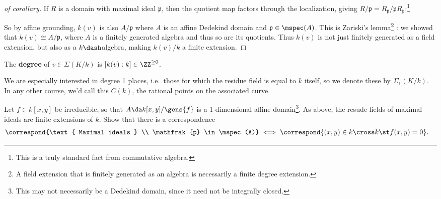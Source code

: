 \begin{proof}[of corollary]

If \(R\) is a domain with maximal ideal \(\mathfrak{p}\), then the
quotient map factors through the localization, giving
\(R/\mathfrak{p} = R_{\mathfrak{p}} / \mathfrak{p} R_{\mathfrak{p}}\):\footnote{This
  is a truly standard fact from commutative algebra.}

\begin{center}\end{center}

So by affine grounding, \(k(v)\) is also \(A/\mathfrak{p}\) where \(A\)
is an affine Dedekind domain and \(\mathfrak{p}\in \mspec(A)\). This is
Zariski's lemma\footnote{A field extension that is finitely generated as
  an algebra is necessarily a finite degree extension.} : we showed that
\(k(v) \cong A/\mathfrak{p}\), where \(A\) is a finitely generated
algebra and thus so are its quotients. Thus \(k(v)\) is not just
finitely generated as a field extension, but also as a
\(k\dash\)algebra, making \(k(v)/k\) a finite extension.

\end{proof}

\begin{definition}

The \textbf{degree} of \(v\in \Sigma(K/k)\) is
\([k(v) : k] \in \ZZ^{\geq 0}\).

\end{definition}

We are especially interested in degree 1 places, i.e.~those for which
the residue field is equal to \(k\) itself, so we denote these by
\(\Sigma_1(K/k)\). In any other course, we'd call this \(C(k)\), the
rational points on the associated curve.

\begin{exercise}

Let \(f\in k[x, y]\) be irreducible, so that
\(A \da k[x, y] / \gens{f}\) is a 1-dimensional affine
domain\footnote{This may not necessarily be a Dedekind domain, since it
  need not be integrally closed.}. As above, the resude fields of
maximal ideals are finite extensions of \(k\). Show that there is a
correspondence
\begin{align*}  
\correspond{\text{ Maximal ideals } \\ \mathfrak{p} \in \mspec(A)}
&\iff
\correspond{(x, y) \in k\cross k \st f(x, y) = 0}
.\end{align*}

\end{exercise}

